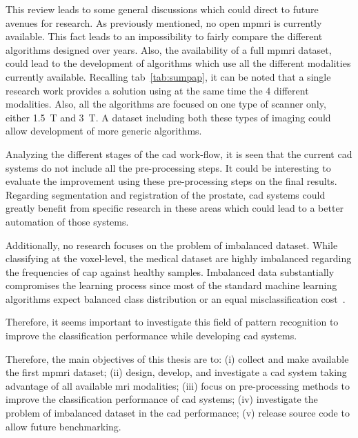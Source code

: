 This review leads to some general discussions which could direct to future
avenues for research.
As previously mentioned, no open \ac{mpmri} is currently available.
This fact leads to an impossibility to fairly compare the different algorithms
designed over years.
Also, the availability of a full \ac{mpmri} dataset, could lead to the
development of algorithms which use all the different modalities currently
available.
Recalling \acs{tab}~\ref{tab:sumpap}, it can be noted that a single research
work provides a solution using at the same time the 4 different modalities.
Also, all the algorithms are focused on one type of scanner only, either
\SI{1.5}{\tesla} and \SI{3}{\tesla}.
A dataset including both these types of imaging could allow development of more
generic algorithms.

Analyzing the different stages of the \ac{cad} work-flow, it is seen that the
current \ac{cad} systems do not include all the pre-processing steps.
It could be interesting to evaluate the improvement using these pre-processing
steps on the final results.
Regarding segmentation and registration of the prostate, \ac{cad} systems could
greatly benefit from specific research in these areas which could lead to a
better automation of those systems.

Additionally, no research focuses on the problem of imbalanced dataset.
While classifying at the voxel-level, the medical dataset are highly imbalanced
regarding the frequencies of \ac{cap} against healthy samples.
Imbalanced data substantially compromises the learning process since most of
the standard machine learning algorithms expect balanced class distribution or
an equal misclassification cost~\cite{he2009learning}.

Therefore, it seems important to investigate this field of pattern recognition
to improve the classification performance while developing \ac{cad} systems.

Therefore, the main objectives of this thesis are to: (i) collect and make
available the first \ac{mpmri} dataset; (ii) design, develop, and investigate a
\ac{cad} system taking advantage of all available \ac{mri} modalities; (iii)
focus on pre-processing methods to improve the classification performance of
\ac{cad} systems; (iv) investigate the problem of imbalanced dataset in the
\ac{cad} performance; (v) release source code to allow future benchmarking.
